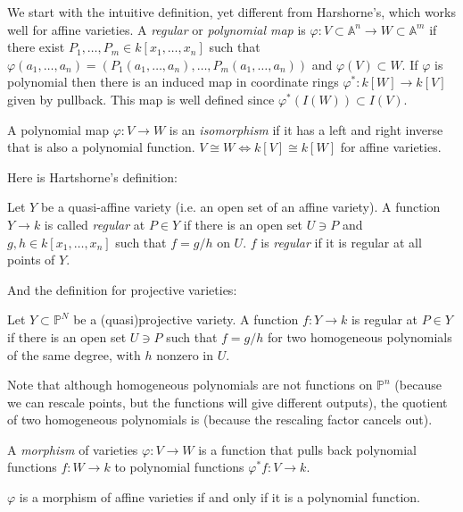 \documentclass{book}
\begin{document}
\noindent
We start with the intuitive definition, yet
different from Harshorne's,
which works well for affine varieties.
A {\it regular} or {\it polynomial map}
is $\varphi:V \subset \mathbb{A}^n \to W
\subset \mathbb{A}^m$
if there exist $P_1,…,P_m \in k[x_1,…,x_n]$
such that
$\varphi(a_1,…,a_n)=(P_1(a_1,…,a_n),…,
P_m(a_1,…,a_n))$
and $\varphi(V) \subset W$.
If $\varphi$ is polynomial then there is an
induced
map in coordinate rings
$\varphi^*:k[W] \to k[V]$ given by pullback.
This map is well defined since
$\varphi^*(I(W))\subset I(V)$.

A polynomial map $\varphi:V \to W$ is an {\it
isomorphism}
if it has a left and right inverse that is
also a polynomial function.
$V \cong W \iff k[V] \cong k[W]$ for affine
varieties.

\medskip\noindent
Here is Hartshorne's definition:

\begin{definition}
\label{definition-regular-function}
Let $Y$ be a quasi-affine variety
(i.e. an open set of an affine variety).
A function $Y \to k$ is called {\it regular}
at $P \in Y$
if there is an open set $U \ni P$ and
$g,h \in k[x_1,…,x_n]$ such that
$f=g/h$ on $U$. $f$ is {\it regular} if it is
regular
at all points of $Y$.
\end{definition}

\noindent
And the definition for projective varieties:

\begin{definition}
\label{definition-regul-funct-proje}
Let $Y \subset \mathbb{P}^N$ be a
(quasi)projective variety.
A function $f:Y \to k$ is regular at $P \in
Y$
if there is an open set $U \ni P$ such that
$f=g/h$ for two homogeneous polynomials of
the same degree,
with $h$ nonzero in $U$.
\end{definition}

\noindent
Note that although homogeneous polynomials
are not functions on $\mathbb{P}^n$
(because we can rescale points, but the
functions will give different outputs),
the quotient of two homogeneous polynomials
is (because the rescaling factor
cancels out).

\begin{definition}
\label{definition-morphism}
A {\it morphism} of varieties $\varphi:V \to
W$
is a function that pulls back polynomial
functions
$f:W \to k$ to polynomial functions
$\varphi^*f:V \to k$.
\end{definition}

\begin{exercise}
\label{exercise-morphisms-def}
$\varphi$ is a morphism of affine varieties
if and only if
it is a polynomial function.
\end{exercise}
\end{document}
